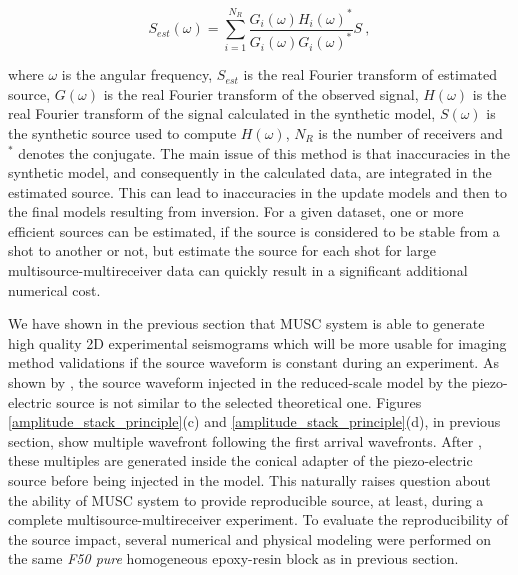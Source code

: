 \documentclass[manuscript,revised]{geophysics}
\begin{document}
\begin{equation}
	S_{est}(\omega)=\sum\limits_{i=1}^{N_{R}}\frac{G_{i}(\omega)H_{i}(\omega)^{*}}{G_{i}(\omega)G_{i}(\omega)^{*}}S\ ,
	\label{eq:lswe}
\end{equation}

\noindent where $\omega$ is the angular frequency, $S_{est}$ is the real Fourier transform of estimated source, $G(\omega)$ is the real Fourier transform of the observed signal, $H(\omega)$ is the real Fourier transform of the signal calculated in the synthetic model, $S(\omega)$ is the synthetic source used to compute $H(\omega)$, $N_{R}$ is the number of receivers and $^{*}$ denotes the conjugate. The main issue of this method is that inaccuracies in the synthetic model, and consequently in the calculated data, are integrated in the estimated source. This can lead to inaccuracies in the update models and then to the final models resulting from inversion. For a given dataset, one or more efficient sources can be estimated, if the source is considered to be stable from a shot to another or not, but estimate the source for each shot for large multisource-multireceiver data can quickly result in a significant additional numerical cost.      

\noindent We have shown in the previous section that MUSC system is able to generate high quality 2D experimental seismograms which will be more usable for imaging method validations if the source waveform is constant during an experiment. As shown by \citet{Bretaudeau_SSM_2011}, the source waveform injected in the reduced-scale model by the piezo-electric source is not similar to the selected theoretical one. Figures \ref{amplitude_stack_principle}(c) and \ref{amplitude_stack_principle}(d), in previous section, show multiple wavefront following the first arrival wavefronts. After \citet{Bretaudeau_SSM_2011}, these multiples are generated inside the conical adapter of the piezo-electric source before being injected in the model. This naturally raises question about the ability of MUSC system to provide reproducible source, at least, during a complete multisource-multireceiver experiment. To evaluate the reproducibility of the source impact, several numerical and physical modeling were performed on the same \textit{F50 pure} homogeneous epoxy-resin block as in previous section. 

\end{document}

